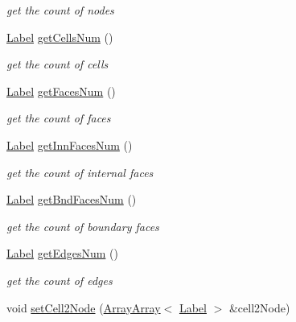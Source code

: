 \begin{DoxyCompactItemize}
\begin{DoxyCompactList}\small\item\em get the count of nodes \item\end{DoxyCompactList}\item 
\hyperlink{namespaceHSF_ae65d72be782e989396ebe5ec6ae4c2b6}{Label} \hyperlink{classHSF_1_1Topology_ae29fdf46363c034e08ba9a7b6eaeb912}{getCellsNum} ()
\begin{DoxyCompactList}\small\item\em get the count of cells \item\end{DoxyCompactList}\item 
\hyperlink{namespaceHSF_ae65d72be782e989396ebe5ec6ae4c2b6}{Label} \hyperlink{classHSF_1_1Topology_ad9ec7de46508d5c6f2d3307b84c2bcb0}{getFacesNum} ()
\begin{DoxyCompactList}\small\item\em get the count of faces \item\end{DoxyCompactList}\item 
\hyperlink{namespaceHSF_ae65d72be782e989396ebe5ec6ae4c2b6}{Label} \hyperlink{classHSF_1_1Topology_a7b260fdf67cfe1290b8302fa46b79e70}{getInnFacesNum} ()
\begin{DoxyCompactList}\small\item\em get the count of internal faces \item\end{DoxyCompactList}\item 
\hyperlink{namespaceHSF_ae65d72be782e989396ebe5ec6ae4c2b6}{Label} \hyperlink{classHSF_1_1Topology_a14bba9407c2c026f94acbd9915bfa2a0}{getBndFacesNum} ()
\begin{DoxyCompactList}\small\item\em get the count of boundary faces \item\end{DoxyCompactList}\item 
\hyperlink{namespaceHSF_ae65d72be782e989396ebe5ec6ae4c2b6}{Label} \hyperlink{classHSF_1_1Topology_aacb3bbf08010f13016ac3db329f18bb8}{getEdgesNum} ()
\begin{DoxyCompactList}\small\item\em get the count of edges \item\end{DoxyCompactList}\item 
void \hyperlink{classHSF_1_1Topology_a6a372d4d321126c3626c27f777753729}{setCell2Node} (\hyperlink{classHSF_1_1ArrayArray}{ArrayArray}$<$ \hyperlink{namespaceHSF_ae65d72be782e989396ebe5ec6ae4c2b6}{Label} $>$ \&cell2Node)

\end{DoxyCompactItemize}
